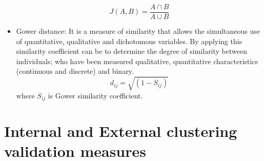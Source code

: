 \begin{itemize}
    \begin{equation}
        J(A,B) = \frac{A \cap B}{A \cup B}
    \end{equation}
    \item Gower distance: It is a measure of similarity that allows the simultaneous use of quantitative, qualitative and dichotomous variables. By applying this similarity coefficient can be to determine the degree of similarity between individuals; who have been measured qualitative, quantitative characteristics (continuous and discrete) and binary.
    \begin{equation}
        d_{ij}=\sqrt{(1-S_{ij})}
    \end{equation}
    where $S_{ij}$ is Gower similarity coefficient.
\end{itemize}

\section*{Internal and External clustering validation measures}\label{internalandexternalmetricssec}

